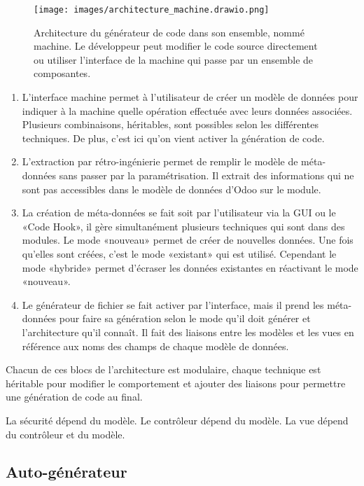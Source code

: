 \begin{figure}[htb]
\centering
\texttt{[image: images/architecture\_machine.drawio.png]}
\caption{Architecture du générateur de code dans son ensemble, nommé machine. Le développeur peut modifier le code source directement ou utiliser l'interface de la machine qui passe par un ensemble de composantes.}
\label{fig:dia_architecture_automate}
\end{figure}

\begin{enumerate}
    \item L’interface machine permet à l’utilisateur de créer un modèle de données pour indiquer à la machine quelle opération effectuée avec leurs données associées. Plusieurs combinaisons, héritables, sont possibles selon les différentes techniques. De plus, c’est ici qu’on vient activer la génération de code.
    \item L’extraction par rétro-ingénierie permet de remplir le modèle de méta-données sans passer par la paramétrisation. Il extrait des informations qui ne sont pas accessibles dans le modèle de données d’Odoo sur le module.
    \item La création de méta-données se fait soit par l’utilisateur via la GUI ou le «Code Hook», il gère simultanément plusieurs techniques qui sont dans des modules. Le mode «nouveau» permet de créer de nouvelles données. Une fois qu’elles sont créées, c’est le mode «existant» qui est utilisé. Cependant le mode «hybride» permet d’écraser les données existantes en réactivant le mode «nouveau».
    \item Le générateur de fichier se fait activer par l’interface, mais il prend les méta-données pour faire sa génération selon le mode qu’il doit générer et l’architecture qu’il connaît. Il fait des liaisons entre les modèles et les vues en référence aux noms des champs de chaque modèle de données.
\end{enumerate}

Chacun de ces blocs de l’architecture est modulaire, chaque technique est héritable pour modifier le comportement et ajouter des liaisons pour permettre une génération de code au final.

La sécurité dépend du modèle. Le contrôleur dépend du modèle. La vue dépend du contrôleur et du modèle.

\subsection{Auto-générateur}

